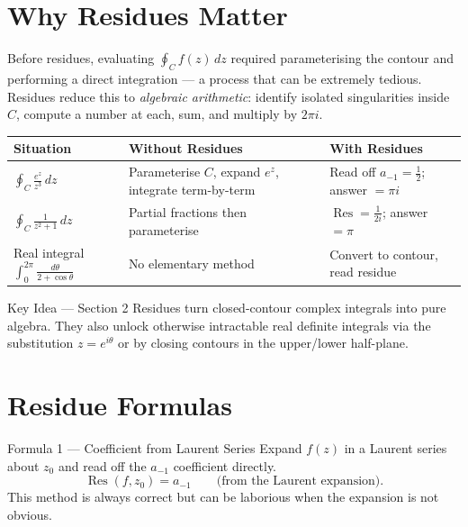 \documentclass[12pt,a4paper]{article}
\begin{document}
\section{Why Residues Matter}

Before residues, evaluating $\oint_C f(z)\,dz$ required parameterising the contour and
performing a direct integration --- a process that can be extremely tedious.
Residues reduce this to \emph{algebraic arithmetic}: identify isolated singularities inside $C$,
compute a number at each, sum, and multiply by $2\pi i$.

\begin{center}
\begin{tabular}{@{}lll@{}}
\toprule
\textbf{Situation} & \textbf{Without Residues} & \textbf{With Residues} \\
\midrule
$\oint_C \frac{e^z}{z^3}\,dz$ & Parameterise $C$, expand $e^z$, integrate term-by-term & Read off $a_{-1} = \tfrac{1}{2}$; answer $= \pi i$ \\
$\oint_C \frac{1}{z^2+1}\,dz$ & Partial fractions then parameterise & $\operatorname{Res} = \tfrac{1}{2i}$; answer $= \pi$ \\
Real integral $\int_0^{2\pi}\!\frac{d\theta}{2+\cos\theta}$ & No elementary method & Convert to contour, read residue \\
\bottomrule
\end{tabular}
\end{center}

\begin{learnbox}{Key Idea --- Section 2}
Residues turn closed-contour complex integrals into pure algebra.  They also unlock otherwise
intractable real definite integrals via the substitution $z = e^{i\theta}$ or by closing contours
in the upper/lower half-plane.
\end{learnbox}

\section{Residue Formulas}

\begin{infobox}{Formula 1 --- Coefficient from Laurent Series}
Expand $f(z)$ in a Laurent series about $z_0$ and read off the $a_{-1}$ coefficient directly.
\[
   \operatorname{Res}(f, z_0) = a_{-1}
   \qquad \text{(from the Laurent expansion)}.
\]
This method is always correct but can be laborious when the expansion is not obvious.
\end{infobox}
\end{document}

